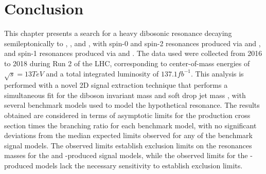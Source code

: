 
\section{Conclusion}
\label{sec:conclusion}

This chapter presents a search for a heavy dibosonic resonance decaying semileptonically to \WW, \WZ, and \WH, with spin-0 and spin-2 resonances produced via \ggF and \VBF, and spin-1 resonances produced via \DY and \VBF.
The data used were collected from 2016 to 2018 during Run 2 of the LHC, corresponding to center-of-mass energies of $\sqrt{s}=13\unit{TeV}$ and a total integrated luminosity of $137.1\unit{fb^{-1}}$.
This analysis is performed with a novel 2D signal extraction technique that performs a simultaneous fit for the diboson invariant mass \MVV and soft drop jet mass \MJ, with several benchmark models used to model the hypothetical resonance.
The results obtained are considered in terms of asymptotic limits for the production cross section times the branching ratio for each benchmark model, with no significant deviations from the median expected limits observed for any of the benchmark signal models.
The observed limits establish exclusion limits on the resonances masses for the \DY and \ggF-produced signal models, while the observed limits for the \VBF-produced models lack the necessary sensitivity to establish exclusion limits.

